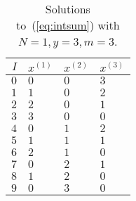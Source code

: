 \documentclass{article}
\begin{document}
\begin{table}
\begin{center}
\begin{tabular}{r|lll}
$I$ & $x^{(1)}$ & $x^{(2)}$ & $x^{(3)}$
\\ \hline
$0$ & $0$ & $0$ & $3$ \\
$1$ & $1$ & $0$ & $2$ \\
$2$ & $2$ & $0$ & $1$ \\
$3$ & $3$ & $0$ & $0$ \\
$4$ & $0$ & $1$ & $2$ \\
$5$ & $1$ & $1$ & $1$ \\
$6$ & $2$ & $1$ & $0$ \\
$7$ & $0$ & $2$ & $1$ \\
$8$ & $1$ & $2$ & $0$ \\
$9$ & $0$ & $3$ & $0$
\end{tabular}
\end{center}
\caption{
\label{tab:y3m3}
Solutions to~(\ref{eq:intsum}) with $N=1,y=3,m=3$.
}
\end{table}
\end{document}
